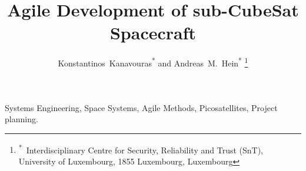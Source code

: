 \documentclass[journal,10pt]{IEEEtran}
\begin{document}


\title{Agile Development of sub-CubeSat Spacecraft}


\author{
	\author{Konstantinos~Kanavouras\textsuperscript{*} and Andreas~M.~Hein\textsuperscript{*}%
	\thanks{\textsuperscript{*}\ Interdisciplinary Centre for Security, Reliability and Trust (SnT), University of Luxembourg, 1855 Luxembourg, Luxembourg}%
	}%
}

\maketitle

\begin{IEEEkeywords}
	Systems Engineering, Space Systems, Agile Methods, Picosatellites, Project planning.
\end{IEEEkeywords}
\end{document}
